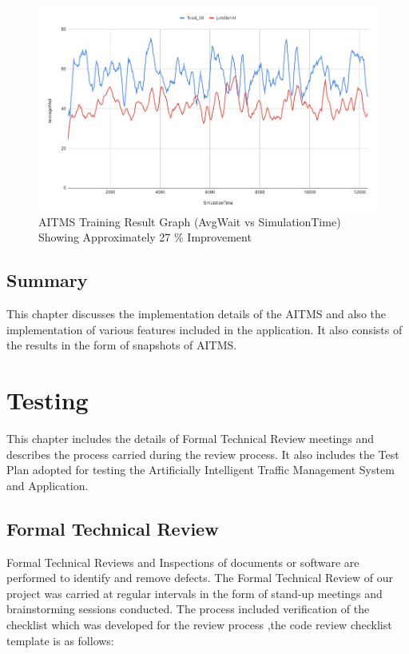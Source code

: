 \documentclass[openany,12pt]{report}
\begin{document}
		\begin{figure}[H]
			\centering
			\includegraphics[width=6in]{./Diagrams/PNG/result}
			\caption{AITMS Training Result Graph (AvgWait vs SimulationTime) Showing Approximately 27 \% Improvement}
		\end{figure}	
		
		
		\section{Summary}
		\hspace*{0.5in}This chapter discusses the implementation details of the AITMS and also the implementation of various features included in the application. It also consists of the results in the form of snapshots of AITMS.
		
		
		\chapter{Testing}
		\hspace*{0.5in}This chapter includes the details of Formal Technical Review meetings and describes the process carried during the review process. It also includes the Test Plan adopted for testing the Artificially Intelligent Traffic Management System and Application.
		\section{Formal Technical Review}
		\hspace*{0.5in}Formal Technical Reviews and Inspections of documents or software are performed to identify and remove defects. The Formal Technical Review of our project was carried at regular intervals in the form of stand-up meetings and brainstorming sessions conducted. The process included verification of the checklist which was developed for the review process ,the code review  checklist template is as follows:
		
\end{document}
